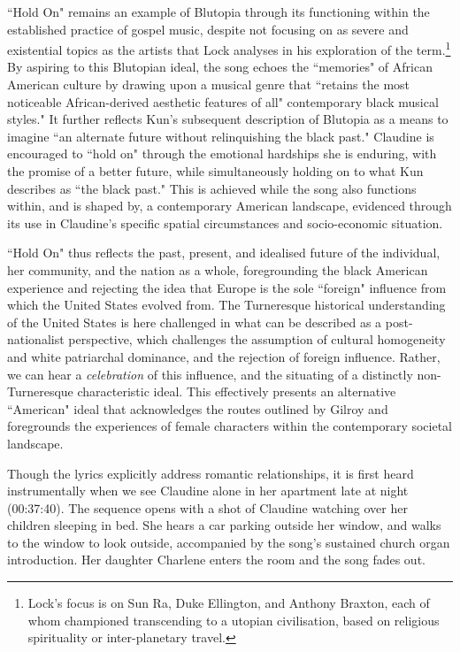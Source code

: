 ``Hold On" remains an example of Blutopia through its functioning within the established practice of gospel music, despite not focusing on as severe and existential topics as the artists that Lock analyses in his exploration of the term.\footnote{Lock's focus is on Sun Ra, Duke Ellington, and Anthony Braxton, each of whom championed transcending to a utopian civilisation, based on religious spirituality or inter-planetary travel.}
By aspiring to this Blutopian ideal, the song echoes the ``memories" of African American culture by drawing upon a musical genre that ``retains the most noticeable African-derived aesthetic features of all" contemporary black musical styles."\autocite[][373]{williams-jones_afro-american_1975}
It further reflects Kun's subsequent description of Blutopia as a means to imagine ``an alternate future without relinquishing the black past."\autocite[][24]{kun_audiotopia_2005}
Claudine is encouraged to ``hold on" through the emotional hardships she is enduring, with the promise of a better future, while simultaneously holding on to what Kun describes as ``the black past."
This is achieved while the song also functions within, and is shaped by, a contemporary American landscape, evidenced through its use in Claudine's specific spatial circumstances and socio-economic situation.

``Hold On" thus reflects the past, present, and idealised future of the individual, her community, and the nation as a whole, foregrounding the black American experience and rejecting the idea that Europe is the sole ``foreign" influence from which the United States evolved from.
The Turneresque historical understanding of the United States is here challenged in what can be described as a post-nationalist perspective, which challenges the assumption of cultural homogeneity and white patriarchal dominance, and the rejection of foreign influence.
Rather, we can hear a \textit{celebration} of this influence, and the situating of a distinctly non-Turneresque characteristic ideal.
This effectively presents an alternative ``American" ideal that acknowledges the routes outlined by Gilroy and foregrounds the experiences of female characters within the contemporary societal landscape.


Though the lyrics explicitly address romantic relationships, it is first heard instrumentally when we see Claudine alone in her apartment late at night (00:37:40).
The sequence opens with a shot of Claudine watching over her children sleeping in bed.
She hears a car parking outside her window, and walks to the window to look outside, accompanied by the song's sustained church organ introduction.
Her daughter Charlene enters the room and the song fades out.

